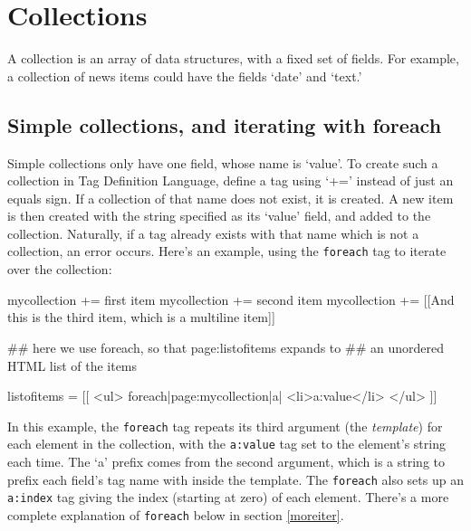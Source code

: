 %
%
%
%
%
%
% 
%
% 
% 
%

\chapter{Collections}
\label{collchap}
A collection is an array of data structures, with a fixed set of fields.
For example, a collection of news items could have the fields `date' and `text.'

\section{Simple collections, and iterating with foreach}
Simple collections only have one field, whose name is `value'.
To create such a collection in Tag Definition Language, define a tag using `+=' instead
of just an equals sign. If a collection of that name does not exist, it is created.
A new item is then created with the string specified as its `value' field, and added to the
collection. Naturally, if a tag already exists with that
name which is not a collection, an error occurs. Here's an example,
using the \texttt{foreach} tag to iterate over the collection:

\begin{MyVerbatim}
 mycollection += first item
 mycollection += second item
 mycollection += [[And this is the third item, which is 
   a multiline item]]

 ## here we use foreach, so that {{page:listofitems}} expands to
 ## an unordered HTML list of the items

 listofitems = [[
     <ul>
     {{foreach|{{page:mycollection}}|a|
         <li>{{a:value}}</li>
     }}
     </ul>
]]
\end{MyVerbatim}
In this example, the \texttt{foreach} tag repeats its third argument (the \emph{template}) for
each element in the collection, with the \texttt{a:value} tag set to the
element's string each time. The `a' prefix comes from the second argument,
which is a string to prefix each field's tag name with inside the template. 
The \texttt{foreach} also sets up an \texttt{a:index} tag giving
the index (starting at zero) of each element. 
There's a more complete explanation of \texttt{foreach} below in section \ref{moreiter}.

